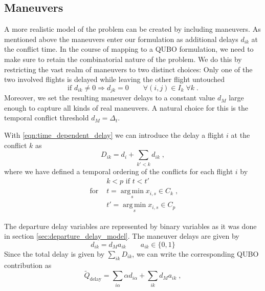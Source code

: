 \subsection{Maneuvers}
A more realistic model of the problem can be created by including maneuvers.
As mentioned above the maneuvers enter our formulation as additional delays $d_{ik}$ at the conflict time.
In the course of mapping to a QUBO formulation, we need to make sure to retain the combinatorial nature of the problem.
We do this by restricting the vast realm of maneuvers to two distinct choices:
Only one of the two involved flights is delayed while leaving the other flight untouched
\begin{equation} \label{eqn:maneuver_model_maneuver_decision}
    \text{if } d_{ik} \neq 0 \Rightarrow d_{jk} = 0  \qquad \forall (i, j) \in I_k \; \forall k \; .
\end{equation}
Moreover, we set the resulting maneuver delays to a constant value $d_M$ large enough to capture all kinds of real maneuvers.
A natural choice for this is the temporal conflict threshold $d_M = \Delta_t$.

With \eqref{eqn:time_dependent_delay} we can introduce the delay a flight $i$ at the conflict $k$ as
\begin{equation} \label{eqn:maneuver_model_delay_at_conflict}
    D_{ik} = d_i + \sum_{k'<k} d_{ik} \; ,
\end{equation}
where we have defined a temporal ordering of the conflicts for each flight $i$ by
\begin{align*}
                 &k < p \text{ if } t < t' \\
    \text{ for } &t = \operatorname*{arg\, min}_s x_{i, s} \in C_k \; , \\
                 &t' = \operatorname*{arg\, min}_s x_{i, s} \in C_p
\end{align*}

The departure delay variables are represented by binary variables as it was done in section \ref{sec:departure_delay_model}.
The maneuver delays are given by
\begin{equation*}
    d_{ik} = d_M a_{ik} \qquad a_{ik} \in \{0, 1\}
\end{equation*}
Since the total delay is given by $\sum_{ik} D_{ik}$, we can write the corresponding QUBO contribution as
\begin{equation*}
    \tilde Q_\text{delay} = \sum_{i\alpha} \alpha d_{i\alpha}  + \sum_{ik} d_M a_{ik}\; ,
\end{equation*}

